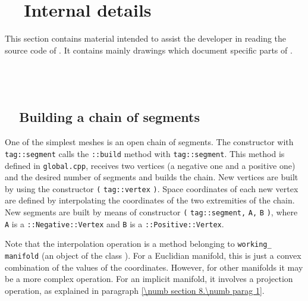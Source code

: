 

\chapter{~~Internal details}\label{\numb section 12}

This section contains material intended to assist the developer in reading the source code
of \maniFEM.
It contains mainly drawings which document specific parts of \maniFEM.


\section{~~\cinza{[empty]}}\label{\numb section 12.\numb parag 1}


\section{~~Building a chain of segments}\label{\numb section 12.\numb parag 2}

One of the simplest meshes is an open chain of segments.
The {\small\tt {}} constructor with {\small\tt \textcolor{tag}{tag}::segment}
calls the {\small\tt{}::build} method with {\small\tt \textcolor{tag}{tag}::segment}.
This method is defined in
{\small\tt global.cpp}, receives two vertices (a negative one and a positive one)
and the desired number of segments and builds the chain.
New vertices are built by using the constructor\hfil\break
{\small\tt {}} {\small\tt(} {\small\tt\textcolor{tag}{tag}::vertex} {\small\tt)}.
Space coordinates of each new vertex are defined by interpolating the coordinates of the
two extremities of the chain.
New segments are built by means of constructor {\small\tt {}} {\small\tt(}
{\small\tt\textcolor{tag}{tag}::segment,} {\small\tt A,} {\small\tt B} {\small\tt )},
where {\small\tt A} is a {\small\tt {}::Negative::Vertex} and {\small\tt B} is a
{\small\tt {}::Positive::Vertex}.

Note that the interpolation operation is a method belonging to {\small\tt working\_\,manifold}
(an object of the class {\small\tt{}}).
For a Euclidian manifold, this is just a convex combination of the values of the coordinates.
However, for other manifolds it may be a more complex operation.
For an implicit manifold, it involves a projection operation, as explained in paragraph
\ref{\numb section 8.\numb parag 1}.


